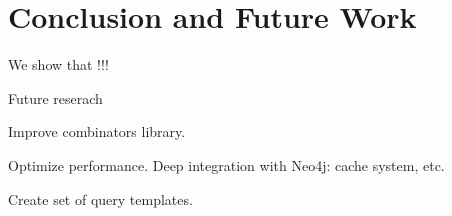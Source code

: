 \section{Conclusion and Future Work}

We show that !!!

Future reserach

Improve combinators library.

Optimize performance. Deep integration with Neo4j: cache system, etc.

Create set of query templates.
